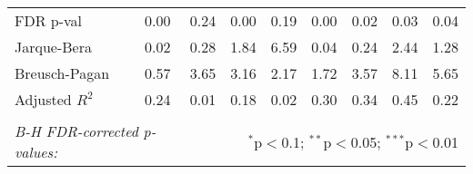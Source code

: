 \documentclass[a4paper,12pt]{article}
\begin{document}
\begin{sidewaystable}
\begin{center}
\begin{tabular}{@{\extracolsep{5pt}}lcccccccc}
FDR p-val & 0.00      & 0.24        & 0.00      & 0.19        & 0.00       & 0.02         & 0.03       & 0.04          \\
Jarque-Bera                  & 0.02      & 0.28        & 1.84      & 6.59        & 0.04       & 0.24         & 2.44       & 1.28          \\
Breusch-Pagan                & 0.57      & 3.65        & 3.16      & 2.17        & 1.72       & 3.57         & 8.11       & 5.65          \\
Adjusted $R^2$           & 0.24      & 0.01        & 0.18      & 0.02        & 0.30       & 0.34         & 0.45       & 0.22          \\
\hline \hline \\ [-1.8ex]
 \multicolumn{2}{l}{\textit{B-H FDR-corrected p-values:}}  & \multicolumn{7}{r}{$^{*}$p$<$0.1; $^{**}$p$<$0.05; $^{***}$p$<$0.01} \\
\end{tabular}
\end{center}
\end{sidewaystable}
\end{document}
